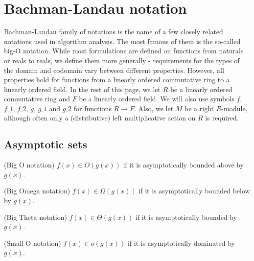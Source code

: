 \section{Bachman-Landau notation}

Bachman-Landau family of notations is the name of a few closely related notations used in 
algorithm analysis. The most famous of them is the so-called big-O notation. While
most formulations are defined on functions from naturals or reals to reals, we define 
them more generally - requirements for the types of the domain and codomain vary between 
different properties. However, all properties hold for functions from a linearly ordered 
commutative ring to a linearly ordered field. In the rest of this page, we let $R$ be a linearly 
ordered commutative ring and $F$ be a linearly ordered field. We will also use symbols $f$, 
$f\_1$, $f\_2$, $g$, $g\_1$ and $g\_2$ for functions $R \to F$. Also, we let $M$ be 
a right $R$-module, although often only a (distributive) left multiplicative 
action on $R$ is required.


\subsection{Asymptotic sets}

\begin{definition}(Big O notation)
    \label{def:big_o}
    \leanok
    $f(x) \in O(g(x))$ if it is asymptotically bounded above by $g(x)$.
\end{definition}

\begin{definition}(Big Omega notation)
    \label{def:big_omega}
    \leanok
    $f(x) \in \Omega(g(x))$ if it is asymptotically bounded below by $g(x)$.
\end{definition}

\begin{definition}(Big Theta notation)
    \label{def:big_theta}
    \leanok
    $f(x) \in \Theta(g(x))$ if it is asymptotically bounded by $g(x)$. 
\end{definition}

\begin{definition}(Small O notation)
    \label{def:small_o}
    \leanok
    $f(x) \in o(g(x))$ if it is asymptotically dominated by $g(x)$.
\end{definition}


